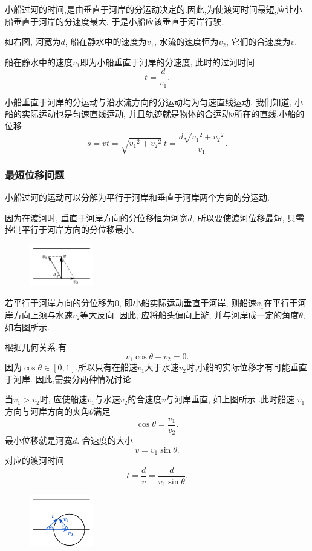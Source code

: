 \documentclass[11pt,a4paper]{ctexart}
\begin{document}
小船过河的时间,是由垂直于河岸的分运动决定的.因此,为使渡河时间最短,应让小船垂直于河岸的分速度最大.
于是小船应该垂直于河岸行驶.

如右图, 河宽为$d$, 船在静水中的速度为$v_1$, 水流的速度恒为$v_2$, 它们的合速度为$v$.

船在静水中的速度$v_1$即为小船垂直于河岸的分速度, 此时的过河时间$$t = \frac{d}{v_1}.$$

小船垂直于河岸的分运动与沿水流方向的分运动均为匀速直线运动, 我们知道, 小船的实际运动也是匀速直线运动,
并且轨迹就是物体的合运动$v$所在的直线.小船的位移
$$s=vt=\sqrt{{v_1}^2 + {v_2}^2}\ t = \frac{d\sqrt{{v_1}^2 + {v_2}^2}}{v_1}.$$

\subsubsection*{最短位移问题}

小船过河的运动可以分解为平行于河岸和垂直于河岸两个方向的分运动.

因为在渡河时, 垂直于河岸方向的分位移恒为河宽$d$, 所以要使渡河位移最短, 只需控制平行于河岸方向的分位移最小.

\begin{figure}
	\flushright
	\includegraphics[width=0.25\textwidth]{pic/pic6.pdf}
	\label{fig6}
\end{figure}

若平行于河岸方向的分位移为0, 即小船实际运动垂直于河岸, 则船速$v_1$在平行于河岸方向上须与水速$v_2$等大反向.
因此, 应将船头偏向上游, 并与河岸成一定的角度$\theta$, 如右图所示.
\setlength{\abovedisplayskip}{3pt}
\setlength{\belowdisplayskip}{3pt}

根据几何关系,有 $$v_1 \cos{\theta} - v_2 = 0.$$
因为$\cos \theta \in [0,1]$,所以只有在船速$v_1$大于水速$v_2$时,小船的实际位移才有可能垂直于河岸.
因此,需要分两种情况讨论.

当$v_1 > v_2$时, 应使船速$v_1$与水速$v_2$的合速度$v$与河岸垂直, 如上图所示 .此时船速 $v_1$
方向与河岸方向的夹角$\theta$满足$$\cos{\theta} = \frac{v_1}{v_2}.$$最小位移就是河宽$d$.
合速度的大小$$v = v_1 \sin{\theta}.$$
对应的渡河时间$$t = \frac{d}{v} = \frac{d}{v_1 \sin{\theta}}.$$

\begin{figure}
	\flushright
	\includegraphics[width=0.25\textwidth]{pic/pic7.pdf}
	\label{fig6}
\end{figure}
\end{document}
